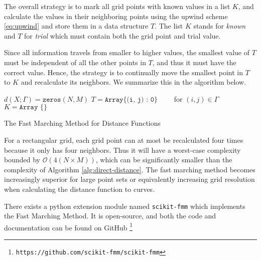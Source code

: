 The overall strategy is to mark all grid points with known values in a list $K$, and calculate the values in their neighboring points using the upwind scheme \eqref{eq:upwind} and store them in a data structure $T$. The list $K$ stands for \textit{known} and $T$ for \textit{trial} which must contain both the grid point and trial value. 

Since all information travels from smaller to higher values, the smallest value of $T$ must be independent of all the other points in $T$, and thus it must have the correct value. Hence, the strategy is to continually move the smallest point in $T$ to $K$ and recalculate its neighbors. We summarize this in the algorithm below.

\begin{algorithm}[H]
\SetAlgoLined
$d(X; \Gamma)=\texttt{zeros}(N,M)$\;
$T = \texttt{Array\{ (i, j) : 0\}} \qquad$ for $(i, j) \in \Gamma$\; 
$K = \texttt{Array \{\}}$

 \caption{The Fast Marching Method for Distance Functions}
 \label{alg:idea-fmm}
\end{algorithm}

For a rectangular grid, each grid point can at most be recalculated four times because it only has four neighbors. Thus it will have a worst-case complexity bounded by $\mathcal{O}(4 (N\times M))$, which can be significantly smaller than the complexity of Algorithm \ref{alg:direct-distance}. The fast marching method becomes increasingly superior for large point sets or equivalently increasing grid resolution when calculating the distance function to curves.

There exists a python extension module named \texttt{scikit-fmm} which implements the Fast Marching Method. It is open-source, and both the code and documentation can be found on GitHub \footnote{\texttt{https://github.com/scikit-fmm/scikit-fmm}}


%

\clearpage